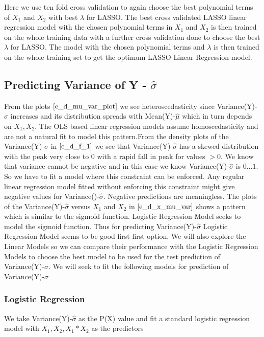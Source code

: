 \documentclass[twoside,12pt]{article}
\begin{document}
Here we use ten fold cross validation to again choose the best polynomial terms of $X_1$ and $X_2$ with best $\lambda$ for LASSO. The best cross validated LASSO linear regression model with the chosen polynomial terms in $X_1$ and $X_2$ is then trained on the whole training data with a further cross validation done to choose the best $\lambda$ for LASSO. The model with the chosen polynomial terms and $\lambda$ is then trained on the whole training set to get the optimum LASSO Linear Regression model.  


\subsection{Predicting Variance of Y - $\hat{\sigma}$}
From the plots $\eqref{e_d_mu_var_plot}$ we see heteroscedasticity since Variance(Y)-$\hat{\sigma}$ increases and its distribution spreads with Mean(Y)-$\hat{\mu}$ which in turn depends on $X_1,X_2$. The OLS based linear regression models assume homoscedasticity and are not a natural fit to model this pattern.From the density plots of the Variance(Y)-$\hat{\sigma}$ in  $\eqref{e_d_f_1}$ we see that Variance(Y)-$\hat{\sigma}$ has a skewed distribution with the peak very close to $0$ with a rapid fall in peak for values $>0$. We know that variance cannot be negative and in this case we know Variance(Y)-$\hat{\sigma}$ is $0 \dots 1$. So we have to fit a model where this constraint can be enforced. Any regular linear regression model fitted without enforcing this constraint might give negative values for Variance()-$\hat{\sigma}$. Negative predictions are meaningless. The plots of the Variance(Y)-$\hat{\sigma}$ versus $X_1$ and $X_2$ in 
$\eqref{e_d_x_mu_var}$ shows a pattern which is similar to the sigmoid function. Logistic Regression Model seeks to model the sigmoid function. Thus for predicting Variance(Y)-$\hat{\sigma}$ Logistic Regression Model seems to be good first first option. We will also explore the Linear Models so we can compare their performance with the Logistic Regression Models to choose the best model to be used for the test prediction of Variance(Y)-$\hat{\sigma}$. We will seek to fit the following models for prediction of Variance(Y)-$\hat{\sigma}$

\subsubsection{Logistic Regression}
We take Variance(Y)-$\hat{\sigma}$ as the P(X) value and fit a standard logistic regression model with $X_1,X_2,X_1*X_2$ as the predictors
\end{document}
